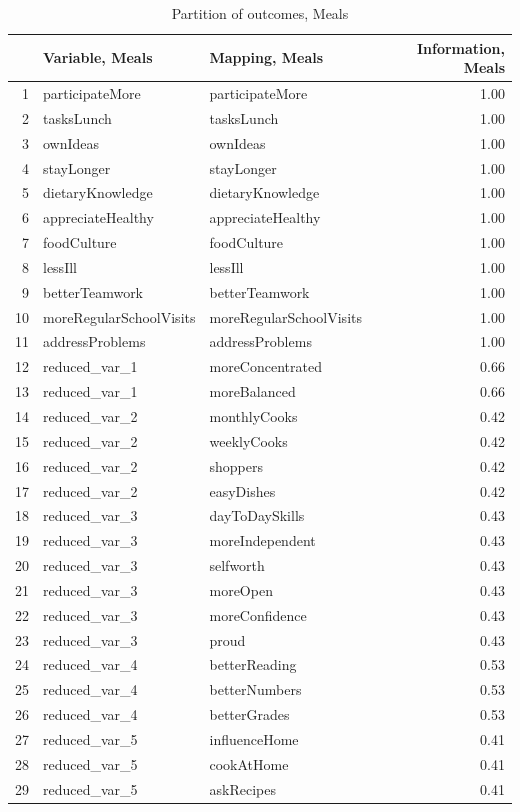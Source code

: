 \documentclass[12pt, a4paper]{article}\usepackage[]{graphicx}\usepackage[]{color}
\begin{document}
\begin{table}[ht]
\centering
\begin{tabular}{rllr}
  \hline
 & Variable, Meals & Mapping, Meals & Information, Meals \\ 
  \hline
1 & participateMore & participateMore & 1.00 \\ 
  2 & tasksLunch & tasksLunch & 1.00 \\ 
  3 & ownIdeas & ownIdeas & 1.00 \\ 
  4 & stayLonger & stayLonger & 1.00 \\ 
  5 & dietaryKnowledge & dietaryKnowledge & 1.00 \\ 
  6 & appreciateHealthy & appreciateHealthy & 1.00 \\ 
  7 & foodCulture & foodCulture & 1.00 \\ 
  8 & lessIll & lessIll & 1.00 \\ 
  9 & betterTeamwork & betterTeamwork & 1.00 \\ 
  10 & moreRegularSchoolVisits & moreRegularSchoolVisits & 1.00 \\ 
  11 & addressProblems & addressProblems & 1.00 \\ 
  12 & reduced\_var\_1 & moreConcentrated & 0.66 \\ 
  13 & reduced\_var\_1 & moreBalanced & 0.66 \\ 
  14 & reduced\_var\_2 & monthlyCooks & 0.42 \\ 
  15 & reduced\_var\_2 & weeklyCooks & 0.42 \\ 
  16 & reduced\_var\_2 & shoppers & 0.42 \\ 
  17 & reduced\_var\_2 & easyDishes & 0.42 \\ 
  18 & reduced\_var\_3 & dayToDaySkills & 0.43 \\ 
  19 & reduced\_var\_3 & moreIndependent & 0.43 \\ 
  20 & reduced\_var\_3 & selfworth & 0.43 \\ 
  21 & reduced\_var\_3 & moreOpen & 0.43 \\ 
  22 & reduced\_var\_3 & moreConfidence & 0.43 \\ 
  23 & reduced\_var\_3 & proud & 0.43 \\ 
  24 & reduced\_var\_4 & betterReading & 0.53 \\ 
  25 & reduced\_var\_4 & betterNumbers & 0.53 \\ 
  26 & reduced\_var\_4 & betterGrades & 0.53 \\ 
  27 & reduced\_var\_5 & influenceHome & 0.41 \\ 
  28 & reduced\_var\_5 & cookAtHome & 0.41 \\ 
  29 & reduced\_var\_5 & askRecipes & 0.41 \\ 
   \hline
\end{tabular}
\caption{Partition of outcomes, Meals} 
\end{table}
\end{document}
